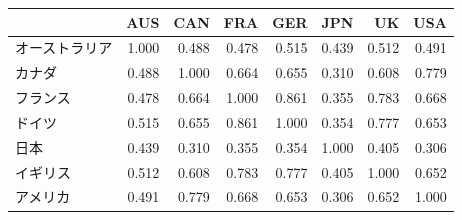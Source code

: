 \begin{tabular}{lrrrrrrr}
\toprule
 & AUS & CAN & FRA & GER & JPN & UK & USA \\
\midrule
オーストラリア & 1.000 & 0.488 & 0.478 & 0.515 & 0.439 & 0.512 & 0.491 \\
カナダ & 0.488 & 1.000 & 0.664 & 0.655 & 0.310 & 0.608 & 0.779 \\
フランス & 0.478 & 0.664 & 1.000 & 0.861 & 0.355 & 0.783 & 0.668 \\
ドイツ & 0.515 & 0.655 & 0.861 & 1.000 & 0.354 & 0.777 & 0.653 \\
日本 & 0.439 & 0.310 & 0.355 & 0.354 & 1.000 & 0.405 & 0.306 \\
イギリス & 0.512 & 0.608 & 0.783 & 0.777 & 0.405 & 1.000 & 0.652 \\
アメリカ & 0.491 & 0.779 & 0.668 & 0.653 & 0.306 & 0.652 & 1.000 \\
\bottomrule
\end{tabular}
